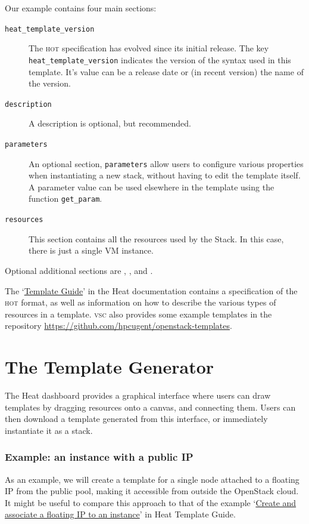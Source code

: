 Our example contains four main sections:
\begin{description}
\item[\texttt{heat\_template\_version}] The \textsc{hot} specification
  has evolved since its initial release.  The key
  \lstinline{heat_template_version} indicates the version of the
  syntax used in this template.  It's value can be a release date or
  (in recent version) the name of the version.
\item[\texttt{description}] A description is optional, but
  recommended.
\item[\texttt{parameters}] An optional section, \lstinline{parameters}
  allow users to configure various properties when instantiating a new
  stack, without having to edit the template itself.  A parameter
  value can be used elsewhere in the template using the function
  \lstinline{get_param}.
\item[\texttt{resources}] This section contains all the resources used
  by the Stack.  In this case, there is just a single VM instance.
\end{description}
Optional additional sections are ,
, and .

The
`\href{https://docs.openstack.org/heat/\osversion/template_guide}{Template
  Guide}' in the Heat documentation contains a specification of the
\textsc{hot} format, as well as information on how to describe the
various types of resources in a template.  \textsc{vsc} also provides
some example templates in the repository
\url{https://github.com/hpcugent/openstack-templates}.

\section{The Template Generator}\label{sec:template-generator}
The Heat dashboard provides a graphical interface where users can draw
templates by dragging resources onto a canvas, and connecting them.
Users can then download a template generated from this interface, or
immediately instantiate it as a stack.

\subsubsection{Example: an instance with a public IP}
As an example, we will create a template for a single node attached to
a floating IP from the public pool, making it accessible from outside
the OpenStack cloud.  It might be useful to compare this approach to
that of the example
`\href{https://docs.openstack.org/heat/\osversion/template_guide/basic_resources.html#create-and-associate-a-floating-ip-to-an-instance}{Create
  and associate a floating IP to an instance}' in Heat Template Guide.


